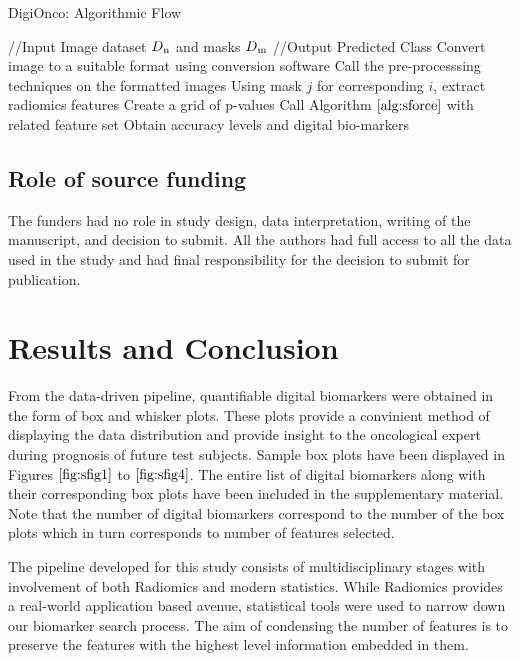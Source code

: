 \documentclass[final,1p,times,twocolumn]{elsarticle}
\begin{document}
\begin{algorithm}[!t]
\caption{DigiOnco: Algorithmic Flow}\label{main}
\begin{algorithmic}[1]
\footnotesize
\STATE //Input Image dataset $D\textsubscript{n}$ and masks $D\textsubscript{m}$ 
\STATE //Output Predicted Class
\STATE Convert image to a suitable format using conversion software
\STATE Call the pre-processsing techniques on the formatted images
\STATE Using mask $j$ for corresponding $i$, extract radiomics features
\STATE Create a grid of p-values
\STATE Call Algorithm $\ref{alg:sforce}$ with related feature set
\ENDFOR
\STATE Obtain accuracy levels and digital bio-markers
\ENDFOR
\end{algorithmic}
\end{algorithm}

\subsection{Role of source funding}

The funders had no role in study design, data interpretation, writing of the manuscript, and decision to submit. All the authors had full access to all the data used in the study and had final responsibility for the decision to submit for publication.

\section{Results and Conclusion}

From the data-driven pipeline, quantifiable digital biomarkers were obtained in the form of box and whisker plots. These plots provide a convinient method of displaying the data distribution and provide insight to the oncological expert during prognosis of future test subjects. Sample box plots have been displayed in Figures $\ref{fig:sfig1}$ to $\ref{fig:sfig4}$. The entire list of digital biomarkers along with their corresponding box plots have been included in the supplementary material. Note that the number of digital biomarkers correspond to the number of the box plots which in turn corresponds to number of features selected. 

The pipeline developed for this study consists of multidisciplinary stages with involvement of both Radiomics and modern statistics. While Radiomics provides a real-world application based avenue, statistical tools were used to narrow down our biomarker search process. The aim of condensing the number of features is to preserve the features with the highest level information embedded in them. 
\end{document}
